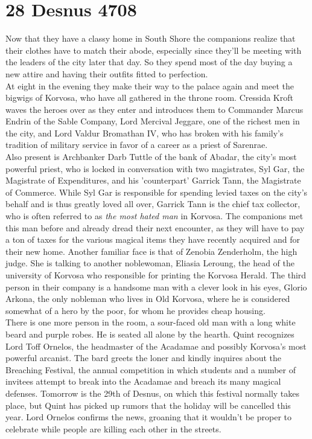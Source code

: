 \section{28 Desnus 4708}

Now that they have a classy home in South Shore the companions realize that their clothes have to match their abode, especially since they'll be meeting with the leaders of the city later that day. So they spend most of the day buying a new attire and having their outfits fitted to perfection.\\

At eight in the evening they make their way to the palace again and meet the bigwigs of Korvosa, who have all gathered in the throne room. Cressida Kroft waves the heroes over as they enter and introduces them to Commander Marcus Endrin of the Sable Company, Lord Mercival Jeggare, one of the richest men in the city, and Lord Valdur Bromathan IV, who has broken with his family's tradition of military service in favor of a career as a priest of Sarenrae.\\

Also present is Archbanker Darb Tuttle of the bank of Abadar, the city's most powerful priest, who is locked in conversation with two magistrates, Syl Gar, the Magistrate of Expenditures, and his 'counterpart' Garrick Tann, the Magistrate of Commerce. While Syl Gar is responsible for spending levied taxes on the city's behalf and is thus greatly loved all over, Garrick Tann is the chief tax collector, who is often referred to as {\itshape the most hated man} in Korvosa. The companions met this man before and already dread their next encounter, as they will have to pay a ton of taxes for the various magical items they have recently acquired and for their new home. Another familiar face is that of Zenobia Zenderholm, the high judge. She is talking to another noblewoman, Eliasia Leroung, the head of the university of Korvosa who responsible for printing the Korvosa Herald. The third person in their company is a handsome man with a clever look in his eyes, Glorio Arkona, the only nobleman who lives in Old Korvosa, where he is considered somewhat of a hero by the poor, for whom he provides cheap housing.\\

There is one more person in the room, a sour-faced old man with a long white beard and purple robes. He is seated all alone by the hearth. Quint recognizes Lord Toff Ornelos, the headmaster of the Acadamae and possibly Korvosa's most powerful arcanist. The bard greets the loner and kindly inquires about the Breaching Festival, the annual competition in which students and a number of invitees attempt to break into the Acadamae and breach its many magical defenses. Tomorrow is the 29th of Desnus, on which this festival normally takes place, but Quint has picked up rumors that the holiday will be cancelled this year. Lord Ornelos confirms the news, groaning that it wouldn't be proper to celebrate while people are killing each other in the streets.\\

